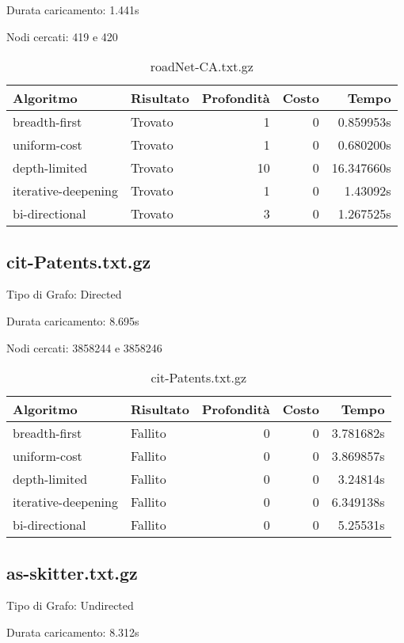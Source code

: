 Durata caricamento: 1.441s

Nodi cercati: 419 e 420

\begin{table}[h]
\centering
\begin{tabular}{|l|l|r|r|r|}
\hline
\textbf{Algoritmo} & \textbf{Risultato} & \textbf{Profondità} & \textbf{Costo} & \textbf{Tempo} \\
 \hline
breadth-first & Trovato & 1 & 0 & 0.859953s \\
uniform-cost & Trovato & 1 & 0 & 0.680200s \\
depth-limited & Trovato & 10 & 0 & 16.347660s \\
iterative-deepening & Trovato & 1 & 0 & 1.43092s \\
bi-directional & Trovato & 3 & 0 & 1.267525s \\
\hline
\end{tabular}
\caption{roadNet-CA.txt.gz}
\end{table}
\subsection{cit-Patents.txt.gz}
Tipo di Grafo: Directed

Durata caricamento: 8.695s

Nodi cercati: 3858244 e 3858246

\begin{table}[h]
\centering
\begin{tabular}{|l|l|r|r|r|}
\hline
\textbf{Algoritmo} & \textbf{Risultato} & \textbf{Profondità} & \textbf{Costo} & \textbf{Tempo} \\
 \hline
breadth-first & Fallito & 0 & 0 & 3.781682s \\
uniform-cost & Fallito & 0 & 0 & 3.869857s \\
depth-limited & Fallito & 0 & 0 & 3.24814s \\
iterative-deepening & Fallito & 0 & 0 & 6.349138s \\
bi-directional & Fallito & 0 & 0 & 5.25531s \\
\hline
\end{tabular}
\caption{cit-Patents.txt.gz}
\end{table}
\subsection{as-skitter.txt.gz}
Tipo di Grafo: Undirected

Durata caricamento: 8.312s

